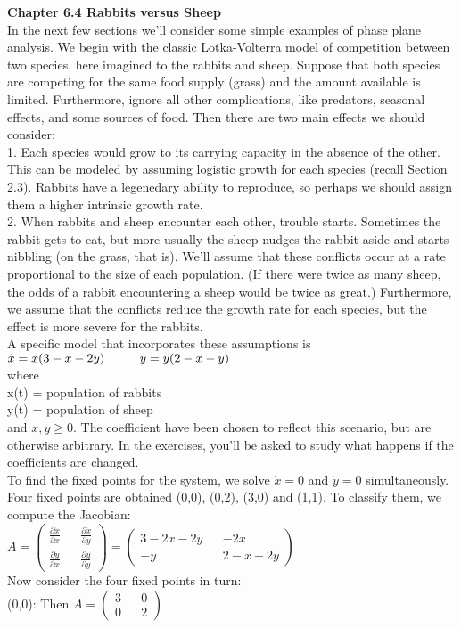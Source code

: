 \documentclass{article}
\newcommand\tab[1][1cm]{\hspace*{#1}}
\begin{document}
\textbf {Chapter 6.4 Rabbits versus Sheep} \\ \tab
In the next few sections we'll consider some simple examples of phase plane analysis. We begin with the classic Lotka-Volterra model of competition between two species, here imagined to the rabbits and sheep. Suppose that both species are competing for the same food supply (grass) and the amount available is limited. Furthermore, ignore all other complications, like predators, seasonal effects, and some sources of food. Then there are two main effects we should consider: \\ \tab
1. Each species would grow to its carrying capacity in the absence of the other. This can be modeled by assuming logistic growth for each species (recall Section 2.3). Rabbits have a legenedary ability to reproduce, so perhaps we should assign them a higher intrinsic growth rate. \\ \tab
2. When rabbits and sheep encounter each other, trouble starts. Sometimes the rabbit gets to eat, but more usually the sheep nudges the rabbit aside and starts nibbling (on the grass, that is). We'll assume that these conflicts occur at a rate proportional to the size of each population. (If there were twice as many sheep, the odds of a rabbit encountering a sheep would be twice as great.) Furthermore, we assume that the conflicts reduce the growth rate for each species, but the effect is more severe for the rabbits. \\ \tab
A specific model that incorporates these assumptions is 
\\ \tab $\dot{x}=x(3-x-2y) \\
\tab \dot{y}=y(2-x-y)$ \\

where \\ \tab
x(t) = population of rabbits \\ 
\tab y(t) = population of sheep \\
and $x,y \geq 0$. The coefficient have been chosen to reflect this scenario, but are otherwise arbitrary. In the exercises, you'll be asked to study what happens if the coefficients are changed. \\
\tab To find the fixed points for the system, we solve $\dot{x}=0$ and $\dot{y}=0$ simultaneously. Four fixed points are obtained (0,0), (0,2), (3,0) and (1,1). To classify them, we compute the Jacobian:
\\ ${A=
\begin{pmatrix}
\frac{\partial \dot{x}}{\partial x} && \frac{\partial \dot{x}}{\partial y} \\
\frac{\partial \dot{y}}{\partial x} && \frac{\partial \dot{y}}{\partial y}
\end{pmatrix}
=
\begin{pmatrix}
3-2x-2y && -2x \\
-y && 2-x-2y
\end{pmatrix}
}$ \\
Now consider the four fixed points in turn: \\ \tab
(0,0): Then ${A = \begin{pmatrix} 3 && 0 \\ 0 && 2 \end{pmatrix}}$ \\
\end{document}
